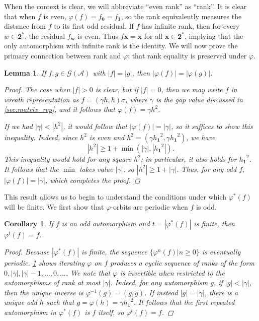 \documentclass[12pt, letterpaper]{article}
\newcommand{\bin}{\mathbf 2}
\newcommand{\A}{\mathcal A}
\newcommand{\ch}[1]{\mathbf{#1}}
\newcommand{\res}[2]{{{#1}_{\ch{#2}}}}
\newcommand{\gp}{\mathcal G}
\newcommand{\rk}[1]{\left|#1\right|}
\newtheorem{lemma}[thm]{Lemma}
\newtheorem{cor}[thm]{Corollary}
\begin{document}
When the context is clear, we will abbreviate ``even rank'' as ``rank''.  It is
clear that when $f$ is even, $\varphi(f) = \res{f}{0} = \res{f}{1}$, so the
rank equivalently measures the distance from $f$ to its first odd residual. If
$f$ has infinite rank, then for every $w \in \bin^*$, the residual $\res{f}{w}$
is even. Thus $f \ch{x} = \ch{x}$ for all $\ch{x} \in \bin^*$, implying that
the only automorphism with infinite rank is the identity. We will now prove the
primary connection between rank and $\varphi$: that rank equality is preserved
under $\varphi$.
\begin{lemma}\label{lemma:rank_varphi}
    If $f, g \in \gp(\A)$ with $\rk{f} = \rk{g}$, then
    $\rk{\varphi(f)} = \rk{\varphi(g)}$.
    \begin{proof}
        The case when $\rk{f} > 0$ is clear, but if $\rk{f} = 0$, then we may
        write $f$ in wreath representation as $f = (\gamma h, h) \sigma$, where
        $\gamma$ is the gap value discussed in \cref{sec:matrix_rep}, and it
        follows that $\varphi(f) = \gamma h^2$.

        If we had $\rk{\gamma} < \rk{h^2}$, it would follow that
        $\rk{\varphi(f)} = \rk{\gamma}$, so it suffices to show this
        inequality. Indeed, since $h^2$ is even and $h^2 = (\gamma
        \res{h}{1}^2, \gamma \res{h}{1}^2)$, we have
        \[
            \rk{h^2} \ge 1 + \min(\rk{\gamma}, \rk{\res{h}{1}^2}).
        \]
        This inequality would hold for any square $h^2$; in particular, it also
        holds for $\res{h}{1}^2$. It follows that the $\min$ takes value
        $\rk{\gamma}$, so $\rk{h^2} \ge 1 + \rk{\gamma}$. Thus, for any odd
        $f$, $\rk{\varphi(f)} = \rk{\gamma}$, which completes the proof.
    \end{proof}
\end{lemma}

This result allows us to begin to understand the conditions under which
$\varphi^*(f)$ will be finite. We first show that $\varphi$-orbits are periodic
when $f$ is odd.

\begin{cor}\label{cor:odd_finite_repeat}
    If $f$ is an odd automorphism and $t = |\varphi^*(f)|$ is finite, then
    $\varphi^t (f) = f$.
    \begin{proof}
        Because $|\varphi^*(f)|$ is finite, the sequence $\{\varphi^n(f) | n
        \ge 0\}$ is eventually periodic. \cref{lemma:rank_varphi} shows
        iterating $\varphi$ on $f$ produces a cyclic sequence of ranks of the
        form $0, \rk{\gamma}, \rk{\gamma} - 1, \ldots, 0, \ldots$.  We note
        that $\varphi$ is invertible when restricted to the automorphisms of
        rank at most $\rk{\gamma}$. Indeed, for any automorphism $g$, if
        $\rk{g} < \rk{\gamma}$, then the unique inverse is $\varphi^{-1}(g) =
        (g, g)$. If instead $\rk{g} = \rk{\gamma}$, there is a unique odd $h$
        such that $g = \varphi(h) = \gamma \res{h}{1}^2$.  It follows that the
        first repeated automorphism in $\varphi^*(f)$ is $f$ itself, so
        $\varphi^t(f) = f$.
    \end{proof}
\end{cor}
\end{document}
